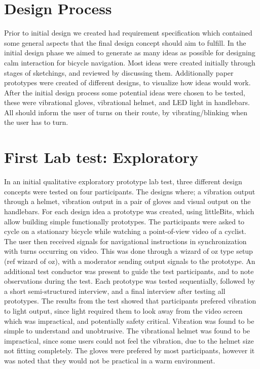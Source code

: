 \documentclass{sigchi}
\begin{document}
\section{Design Process}
Prior to initial design we created had requirement specification which contained some general aspects that the final design concept should aim to fulfill. In the initial design phase we aimed to generate as many ideas as possible for designing calm interaction for bicycle navigation. Most ideas were created initially through stages of sketchings, and reviewed by discussing them. Additionally paper prototypes were created of different designs, to visualize how ideas would work.
\newline
\newline
After the initial design process some potential ideas were chosen to be tested, these were vibrational gloves, vibrational helmet, and LED light in handlebars. All should inform the user of turns on their route, by vibrating/blinking when the user has to turn.
\section{First Lab test: Exploratory}
In an initial qualitative exploratory prototype lab test, three different design concepts were tested on four participants. The designs where; a vibration output through a helmet, vibration output in a pair of gloves and visual output on the handlebars. 
For each design idea a prototype was created, using littleBits, which allow building simple functionally prototypes. The participants were asked to cycle on a stationary bicycle while watching a point-of-view video of a cyclist. The user then received signals for navigational instructions in synchronization with turns occurring on video. This was done through a wizard of oz type setup (ref wizard of oz), with a moderator sending output signals to the prototype. An additional test conductor was present to guide the test participants, and to note observations during the test. Each prototype was tested sequentially, followed by a short semi-structured interview, and a final interview after testing all prototypes.
\newline
\newline
The results from the test showed that participants prefered vibration to light output, since light required them to look away from the video screen which was impractical, and potentially safety critical. Vibration was found to be simple to understand and unobtrusive. The vibrational helmet was found to be impractical, since some users could not feel the vibration, due to the helmet size not fitting completely. The gloves were prefered by most participants, however it was noted that they would not be practical in a warm environment.
\end{document}
